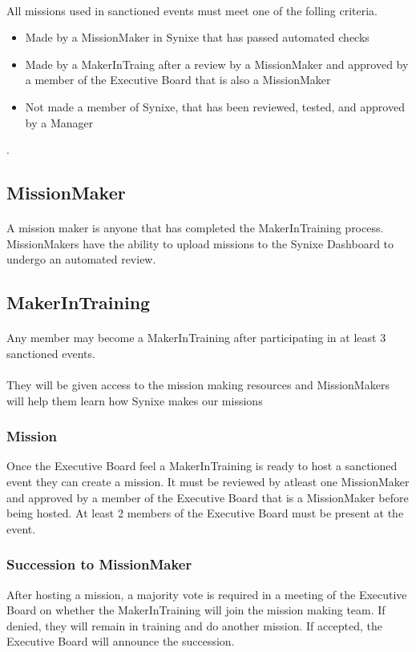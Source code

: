 \documentclass[10pt,a4paper]{article}
\begin{document}
\paragraph{}
All missions used in sanctioned events must meet one of the folling criteria.
\begin{itemize}
  \item Made by a MissionMaker in Synixe that has passed automated checks
  \item Made by a MakerInTraing after a review by a MissionMaker and approved by a member of the Executive Board that is also a MissionMaker
  \item Not made a member of Synixe, that has been reviewed, tested, and approved by a Manager
\end{itemize}.
\subsection{MissionMaker}
\paragraph{}
A mission maker is anyone that has completed the MakerInTraining process. MissionMakers have the ability to upload missions to the Synixe Dashboard to undergo an automated review.
\subsection{MakerInTraining}
\paragraph{}
Any member may become a MakerInTraining after participating in at least 3 sanctioned events.
\paragraph{}
They will be given access to the mission making resources and MissionMakers will help them learn how Synixe makes our missions
\subsubsection{Mission}
Once the Executive Board feel a MakerInTraining is ready to host a sanctioned event they can create a mission. It must be reviewed by atleast one MissionMaker and approved by a member of the Executive Board that is a MissionMaker before being hosted. At least 2 members of the Executive Board must be present at the event.
\subsubsection{Succession to MissionMaker}
After hosting a mission, a majority vote is required in a meeting of the Executive Board on whether the MakerInTraining will join the mission making team. If denied, they will remain in training and do another mission. If accepted, the Executive Board will announce the succession.
\end{document}
